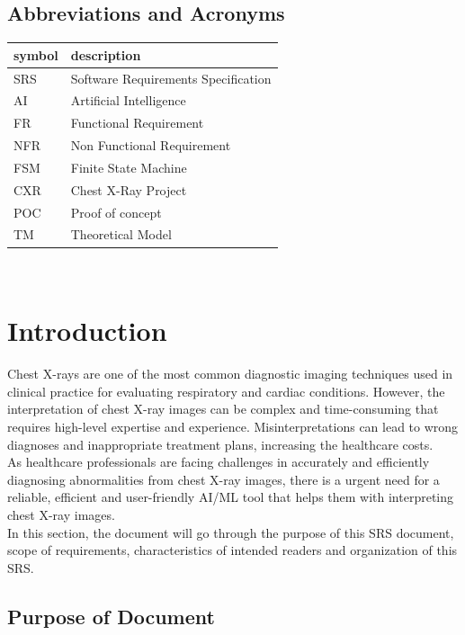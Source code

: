 \documentclass[12pt]{article}
\begin{document}
\subsection{Abbreviations and Acronyms}

\renewcommand{\arraystretch}{1.2}
\begin{tabular}{l l} 
  \toprule		
  \textbf{symbol} & \textbf{description}\\
  \midrule 
  SRS & Software Requirements Specification\\
  AI & Artificial Intelligence\\
  FR & Functional Requirement\\
  NFR & Non Functional Requirement\\
  FSM & Finite State Machine\\
  CXR & Chest X-Ray Project\\
  POC & Proof of concept\\
  TM & Theoretical Model\\
  \bottomrule
\end{tabular}\\

\newpage
\section{Introduction}

Chest X-rays are one of the most common diagnostic imaging techniques used in clinical practice for evaluating respiratory and cardiac conditions. However, the interpretation of chest X-ray images can be complex and time-consuming that requires high-level expertise and experience. Misinterpretations can lead to wrong diagnoses and inappropriate treatment plans, increasing the healthcare costs.\\

As healthcare professionals are facing challenges in accurately and efficiently diagnosing abnormalities from chest X-ray images, there is a urgent need for a reliable, efficient and user-friendly AI/ML tool that helps them with interpreting chest X-ray images.\\

In this section, the document will go through the purpose of this SRS document, scope of requirements, characteristics of intended readers and organization of this SRS.\\



\subsection{Purpose of Document}
\end{document}
